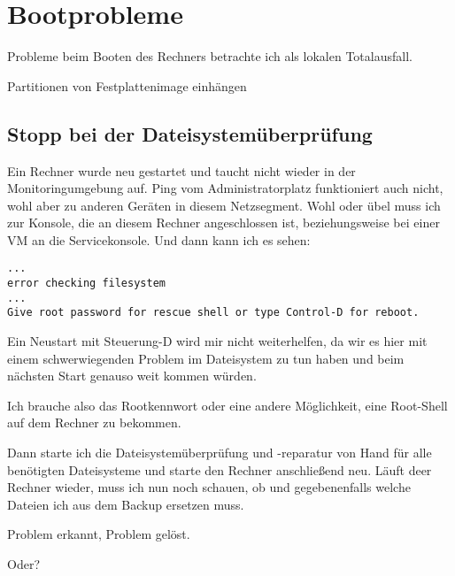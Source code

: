 \chapter{Bootprobleme}
\label{cha:bootprobleme}

\begin{abstractsec}
  Probleme beim Booten des Rechners betrachte ich als lokalen Totalausfall.
\end{abstractsec}

\begin{notes}
\item Partitionen von Festplattenimage einhängen
\end{notes}

\section{Stopp bei der Dateisystemüberprüfung}
\label{sec:lokal-stop-at-fsck}

Ein Rechner wurde neu gestartet und taucht nicht wieder in der
Monitoringumgebung auf. Ping vom Administratorplatz funktioniert auch nicht,
wohl aber zu anderen Geräten in diesem Netzsegment. Wohl oder übel muss ich
zur Konsole, die an diesem Rechner angeschlossen ist, beziehungsweise bei
einer VM an die Servicekonsole. Und dann kann ich es sehen:

\begin{verbatim}
...
error checking filesystem
...
Give root password for rescue shell or type Control-D for reboot.
\end{verbatim}

Ein Neustart mit Steuerung-D wird mir nicht weiterhelfen, da wir es hier mit
einem schwerwiegenden Problem im Dateisystem zu tun haben und beim nächsten
Start genauso weit kommen würden.

Ich brauche also das Rootkennwort oder eine andere Möglichkeit, eine
Root-Shell auf dem Rechner zu bekommen.

Dann starte ich die Dateisystemüberprüfung und -reparatur von Hand für alle
benötigten Dateisysteme und starte den Rechner anschließend neu. Läuft deer
Rechner wieder, muss ich nun noch schauen, ob und gegebenenfalls welche
Dateien ich aus dem Backup ersetzen muss.

Problem erkannt, Problem gelöst.

Oder?

